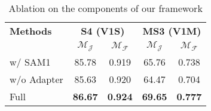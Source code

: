 
\begin{table}[h!]
\centering
\begin{tabular}{lcccc}
\toprule
\textbf{Methods} & \multicolumn{2}{c}{\textbf{S4 (V1S)}} & \multicolumn{2}{c}{\textbf{MS3 (V1M)}} \\ 
\cmidrule(lr){2-3} \cmidrule(lr){4-5}
 &  $\mathcal{M}_{\mathcal{J}}$ & $\mathcal{M}_{\mathcal{F}}$ & $\mathcal{M}_{\mathcal{J}}$ & $\mathcal{M}_{\mathcal{F}}$ \\ 
\midrule
  w/ SAM1 & 85.78 & 0.919 & 65.76 & 0.738 \\
  w/o Adapter & 85.63& 0.920 & 64.47&  0.704\\
  Full & \textbf{86.67}&  \textbf{0.924}&  \textbf{69.65} &  \textbf{0.777}\\
\bottomrule
\end{tabular}
\caption{Ablation on the components of our framework }
\label{tab:ablation}
\end{table}
